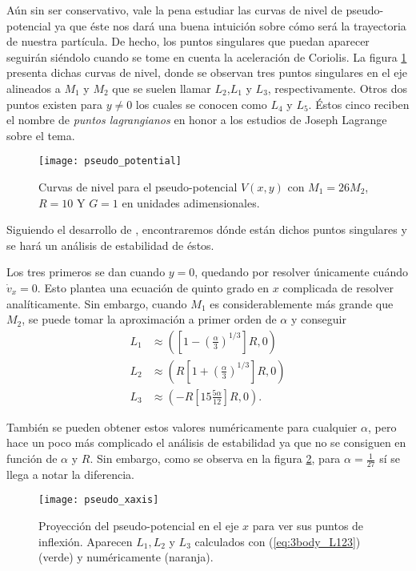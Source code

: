 Aún sin ser conservativo, vale la pena estudiar las curvas de nivel de pseudo-potencial ya que éste nos dará una buena intuición sobre cómo será la trayectoria de nuestra partícula. De hecho, los puntos singulares que puedan aparecer seguirán siéndolo cuando se tome en cuenta la aceleración de Coriolis. La figura \ref{fig:3body_pseudo_potential} presenta dichas curvas de nivel, donde se observan tres puntos singulares en el eje alineados a $M_1$ y $M_2$ que se suelen llamar $L_2$,$L_1$ y $L_3$, respectivamente. Otros dos puntos existen para $y \neq 0$ los cuales se conocen como $L_4$ y $L_5$. Éstos cinco reciben el nombre de \textit{puntos lagrangianos} en honor a los estudios de Joseph Lagrange sobre el tema.

\begin{figure}[h!]
 \centering
 \texttt{[image: pseudo\_potential]}
 \caption{Curvas de nivel para el pseudo-potencial $V(x,y)$ con $M_1 = 26M_2$, $R = 10$ Y $G=1$ en unidades adimensionales.}
 \label{fig:3body_pseudo_potential}
\end{figure}

Siguiendo el desarrollo de \cite{}, encontraremos dónde están dichos puntos singulares y se hará un análisis de estabilidad de éstos.

Los tres primeros se dan cuando $y=0$, quedando por resolver únicamente cuándo $\dot{v}_x = 0$. Esto plantea una ecuación de quinto grado en $x$ complicada de resolver analíticamente. Sin embargo, cuando $M_1$ es considerablemente más grande que $M_2$, se puede tomar la aproximación a primer orden de $\alpha$ y conseguir
\begin{align}
 L_1 &\approx \left( \left[ 1 - \left(\frac{\alpha}{3}\right)^{1/3} \right] R , 0 \right) \nonumber \\ 
 L_2 &\approx \left( R\left[ 1 + \left(\frac{\alpha}{3}\right)^{1/3} \right] R , 0 \right) \nonumber \\
 L_3 &\approx \left( -R\left[ 1 5 \frac{5 \alpha}{12} \right] R, 0 \right).
 \label{eq:3body_L123}
\end{align} 

También se pueden obtener estos valores numéricamente para cualquier $\alpha$, pero hace un poco más complicado el análisis de estabilidad ya que no se consiguen en función de $\alpha$ y $R$. Sin embargo, como se observa en la figura \ref{fig:3body_pseudo_xaxis}, para $\alpha = \frac{1}{27}$ sí se llega a notar la diferencia.

\begin{figure}[h!]
 \centering
 \texttt{[image: pseudo\_xaxis]}
 \caption{Proyección del pseudo-potencial en el eje $x$ para ver sus puntos de inflexión. Aparecen $L_1, L_2$ y $L_3$ calculados con (\ref{eq:3body_L123}) (verde) y numéricamente (naranja).}
 \label{fig:3body_pseudo_xaxis}
\end{figure}

